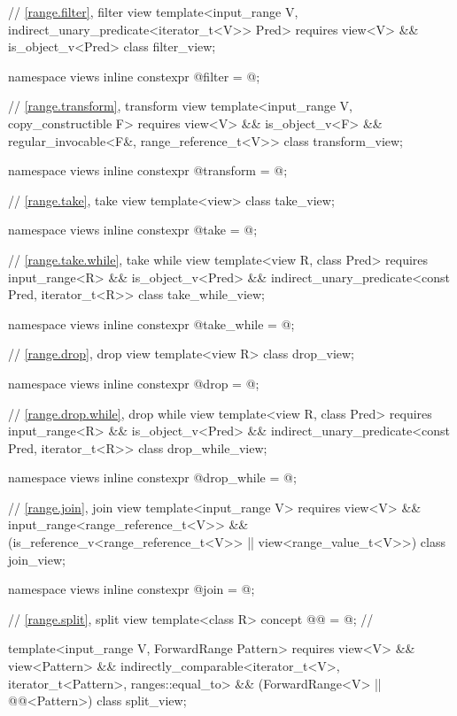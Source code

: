 \begin{codeblock}
{  // \ref{range.filter}, filter view
  template<input_range V, indirect_unary_predicate<iterator_t<V>> Pred>
    requires view<V> && is_object_v<Pred>
  class filter_view;

  namespace views { inline constexpr @\unspec@ filter = @\unspec@; }

  // \ref{range.transform}, transform view
  template<input_range V, copy_constructible F>
    requires view<V> && is_object_v<F> &&
             regular_invocable<F&, range_reference_t<V>>
  class transform_view;

  namespace views { inline constexpr @\unspec@ transform = @\unspec@; }

  // \ref{range.take}, take view
  template<view> class take_view;

  namespace views { inline constexpr @\unspec@ take = @\unspec@; }

  // \ref{range.take.while}, take while view
  template<view R, class Pred>
    requires input_range<R> && is_object_v<Pred> &&
      indirect_unary_predicate<const Pred, iterator_t<R>>
    class take_while_view;

  namespace views { inline constexpr @\unspec@ take_while = @\unspec@; }

  // \ref{range.drop}, drop view
  template<view R>
    class drop_view;

  namespace views { inline constexpr @\unspec@ drop = @\unspec@; }

  // \ref{range.drop.while}, drop while view
  template<view R, class Pred>
    requires input_range<R> && is_object_v<Pred> &&
      indirect_unary_predicate<const Pred, iterator_t<R>>
    class drop_while_view;

  namespace views { inline constexpr @\unspec@ drop_while = @\unspec@; }

  // \ref{range.join}, join view
  template<input_range V>
    requires view<V> && input_range<range_reference_t<V>> &&
             (is_reference_v<range_reference_t<V>> ||
              view<range_value_t<V>>)
  class join_view;

  namespace views { inline constexpr @\unspec@ join = @\unspec@; }

  // \ref{range.split}, split view
  template<class R>
    concept @@ = @\seebelow@;   // \expos

  template<input_range V, ForwardRange Pattern>
    requires view<V> && view<Pattern> &&
             indirectly_comparable<iterator_t<V>, iterator_t<Pattern>, ranges::equal_to> &&
             (ForwardRange<V> || @@<Pattern>)
  class split_view;

}
\end{codeblock}

